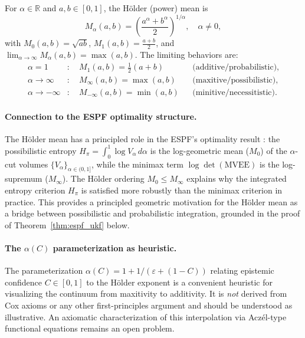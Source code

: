 \documentclass[12pt]{article}
\newcommand{\R}{\mathbb{R}}
\begin{document}
For $\alpha\in\R$ and $a,b\in[0,1]$, the H\"older (power) mean is
\begin{equation}
M_\alpha(a,b) = \left(\frac{a^\alpha+b^\alpha}{2}\right)^{1/\alpha},
\quad \alpha\ne 0,
\label{eq:holder}
\end{equation}
with $M_0(a,b)=\sqrt{ab}$, $M_1(a,b)=\frac{a+b}{2}$, and
$\lim_{\alpha\to\infty}M_\alpha(a,b)=\max(a,b)$.
The limiting behaviors are:
\begin{align}
\alpha=1&: \quad M_1(a,b)=\tfrac{1}{2}(a+b) && \text{(additive/probabilistic)},\\
\alpha\to\infty&: \quad M_\infty(a,b)=\max(a,b) && \text{(maxitive/possibilistic)},\\
\alpha\to-\infty&: \quad M_{-\infty}(a,b)=\min(a,b) && \text{(minitive/necessitistic)}.
\end{align}

\paragraph{Connection to the ESPF optimality structure.}
The H\"older mean has a principled role in the ESPF's optimality result
\cite{jah2026optimality}: the possibilistic entropy $H_\pi=\int_0^1\log V_\alpha\,d\alpha$
is the log-geometric mean ($M_0$) of the $\alpha$-cut volumes
$\{V_\alpha\}_{\alpha\in(0,1]}$, while the minimax term $\log\det(\mathrm{MVEE})$
is the log-supremum ($M_\infty$).
The H\"older ordering $M_0\le M_\infty$ explains why the integrated entropy
criterion $H_\pi$ is satisfied more robustly than the minimax criterion in
practice.
This provides a principled geometric motivation for the H\"older mean as
a bridge between possibilistic and probabilistic integration,
grounded in the proof of Theorem~\ref{thm:espf_ukf} below.

\paragraph{The $\alpha(C)$ parameterization as heuristic.}
The parameterization $\alpha(C)=1+1/(\varepsilon+(1-C))$ relating epistemic
confidence $C\in[0,1]$ to the H\"older exponent is a convenient heuristic
for visualizing the continuum from maxitivity to additivity.
It is \emph{not} derived from Cox axioms or any other first-principles
argument and should be understood as illustrative.
An axiomatic characterization of this interpolation via Acz\'el-type
functional equations remains an open problem.

\end{document}
